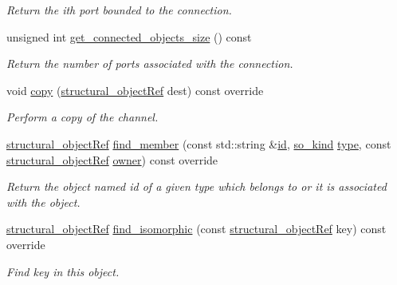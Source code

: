 \begin{DoxyCompactItemize}
\begin{DoxyCompactList}\small\item\em Return the ith port bounded to the connection. \end{DoxyCompactList}\item 
unsigned int \hyperlink{classchannel__o_aa217df8fc4774830d2ba126f88abcb5e}{get\+\_\+connected\+\_\+objects\+\_\+size} () const
\begin{DoxyCompactList}\small\item\em Return the number of ports associated with the connection. \end{DoxyCompactList}\item 
void \hyperlink{classchannel__o_a1e97d51670c7209f2666fdc5431a40a3}{copy} (\hyperlink{structural__objects_8hpp_a8ea5f8cc50ab8f4c31e2751074ff60b2}{structural\+\_\+object\+Ref} dest) const override
\begin{DoxyCompactList}\small\item\em Perform a copy of the channel. \end{DoxyCompactList}\item 
\hyperlink{structural__objects_8hpp_a8ea5f8cc50ab8f4c31e2751074ff60b2}{structural\+\_\+object\+Ref} \hyperlink{classchannel__o_ac5409b74292b8cf624419f3368cac730}{find\+\_\+member} (const std\+::string \&\hyperlink{classstructural__object_a841a75f6e349ff7c1987dc92d4ac33a6}{id}, \hyperlink{structural__objects_8hpp_acf52399aecacb7952e414c5746ce6439}{so\+\_\+kind} \hyperlink{classstructural__object_a9a7159ce4c8da9984f256d9032f49778}{type}, const \hyperlink{structural__objects_8hpp_a8ea5f8cc50ab8f4c31e2751074ff60b2}{structural\+\_\+object\+Ref} \hyperlink{classstructural__object_a3e96b3e00b8a78adfc44872d82e186ea}{owner}) const override
\begin{DoxyCompactList}\small\item\em Return the object named id of a given type which belongs to or it is associated with the object. \end{DoxyCompactList}\item 
\hyperlink{structural__objects_8hpp_a8ea5f8cc50ab8f4c31e2751074ff60b2}{structural\+\_\+object\+Ref} \hyperlink{classchannel__o_a7565783de13f5451d94de9fda826710d}{find\+\_\+isomorphic} (const \hyperlink{structural__objects_8hpp_a8ea5f8cc50ab8f4c31e2751074ff60b2}{structural\+\_\+object\+Ref} key) const override
\begin{DoxyCompactList}\small\item\em Find key in this object. \end{DoxyCompactList}\item 

\end{DoxyCompactItemize}
